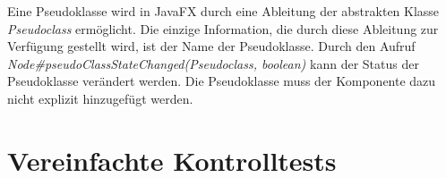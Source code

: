 Eine Pseudoklasse wird in JavaFX durch eine Ableitung der abstrakten Klasse \textit{Pseudoclass} ermöglicht. Die einzige Information, die durch diese Ableitung zur Verfügung gestellt wird, ist der Name der Pseudoklasse. Durch den Aufruf \textit{Node\#{}pseudoClassStateChanged(Pseudoclass, boolean)} kann der Status der Pseudoklasse verändert werden. Die Pseudoklasse muss der Komponente dazu nicht explizit hinzugefügt werden.\par
{}
\section{Vereinfachte Kontrolltests} \label{sec:optiQuality}